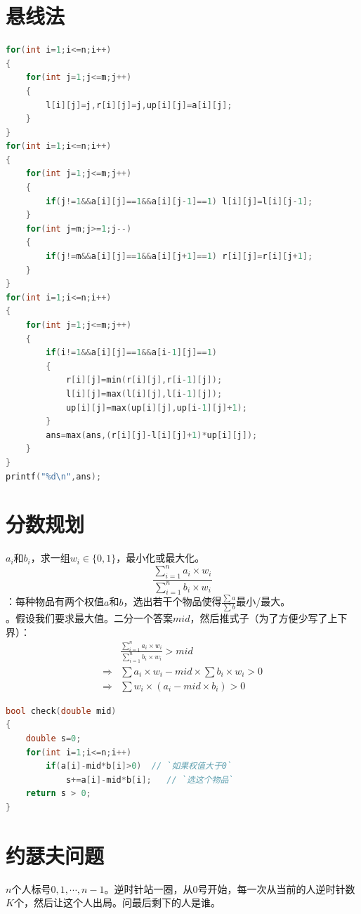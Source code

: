 \documentclass[a4paper]{book}
\begin{document}
\section{悬线法}
\begin{lstlisting}[language=c++,title=最大的1组成的矩阵的面积]
for(int i=1;i<=n;i++)
{
    for(int j=1;j<=m;j++)
    {
        l[i][j]=j,r[i][j]=j,up[i][j]=a[i][j];
    }
}
for(int i=1;i<=n;i++)
{
    for(int j=1;j<=m;j++)
    {
        if(j!=1&&a[i][j]==1&&a[i][j-1]==1) l[i][j]=l[i][j-1];
    }
    for(int j=m;j>=1;j--)
    {
        if(j!=m&&a[i][j]==1&&a[i][j+1]==1) r[i][j]=r[i][j+1];
    }
}
for(int i=1;i<=n;i++)
{
    for(int j=1;j<=m;j++)
    {
        if(i!=1&&a[i][j]==1&&a[i-1][j]==1)
        {
            r[i][j]=min(r[i][j],r[i-1][j]);
            l[i][j]=max(l[i][j],l[i-1][j]);
            up[i][j]=max(up[i][j],up[i-1][j]+1);
        }
        ans=max(ans,(r[i][j]-l[i][j]+1)*up[i][j]);
    }
}
printf("%d\n",ans);
\end{lstlisting}
\section{分数规划}
$a_i$和$b_i$，求一组$w_i\in\{0,1\}$，最小化或最大化。
$$
\displaystyle\frac{\displaystyle\sum_{i=1}^{n}a_i\times w_i}{\displaystyle\sum_{i=1}^{n}b_i\times w_i}
$$
：每种物品有两个权值$a$和$b$，选出若干个物品使得$\frac{\sum a}{\sum b}$最小/最大。\\
。假设我们要求最大值。二分一个答案$mid$，然后推式子（为了方便少写了上下界）：\\
$$
\begin{aligned}
&\displaystyle\frac{\displaystyle\sum_{i=1}^{n}a_i\times w_i}{\displaystyle\sum_{i=1}^{n}b_i\times w_i}>mid\\
\Longrightarrow&\sum a_i\times w_i-mid\times\sum b_i\times w_i>0\\
\Longrightarrow&\sum w_i\times(a_i-mid\times b_i)>0
\end{aligned}
$$
\begin{lstlisting}[language=c++,escapeinside=``]
bool check(double mid) 
{
    double s=0;
    for(int i=1;i<=n;i++)
        if(a[i]-mid*b[i]>0)  // `如果权值大于0`
            s+=a[i]-mid*b[i];   // `选这个物品`
    return s > 0;
}
\end{lstlisting}
\section{约瑟夫问题}
\indent$n$个人标号$0,1,\cdots,n-1$。逆时针站一圈，从$0$号开始，每一次从当前的人逆时针数$K$个，然后让这个人出局。问最后剩下的人是谁。
\end{document}
